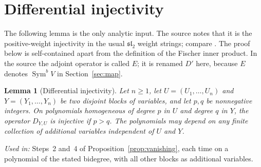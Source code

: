 \documentclass[11pt]{article}
\newtheorem{lemma}[theorem]{Lemma}
\theoremstyle{definition}
\theoremstyle{remark}
\DeclareMathOperator{\Sym}{Sym}
\newcommand{\D}[2]{D_{#1,#2}}
\begin{document}
\section{Differential injectivity}\label{sec:differential}

The following lemma is the only analytic input. The source notes that it is
the positive-weight injectivity in the usual $\mathfrak{sl}_2$ weight
strings; compare
\cite[Section~11.1, Claim~11.4 and equation~(11.5)]{FultonHarris}. The proof
below is self-contained apart from the definition of the Fischer inner
product. In the source the adjoint operator is called $E$; it is renamed
$D'$ here, because $E$ denotes $\Sym^bV$ in Section~\ref{sec:map}.

\begin{lemma}[Differential injectivity]\label{lem:shift}
Let $n\ge1$, let $U=(U_1,\ldots,U_n)$ and $Y=(Y_1,\ldots,Y_n)$ be two
disjoint blocks of variables, and let $p,q$ be nonnegative integers. On
polynomials homogeneous of degree $p$ in $U$ and degree $q$ in $Y$, the
operator $\D{Y}{U}$ is injective if $p>q$. The polynomials may depend on any
finite collection of additional variables independent of $U$ and $Y$.
\end{lemma}

\noindent\emph{Used in:} Steps~2 and~4 of
Proposition~\ref{prop:vanishing}, each time on a polynomial of the stated
bidegree, with all other blocks as additional variables.
\end{document}
